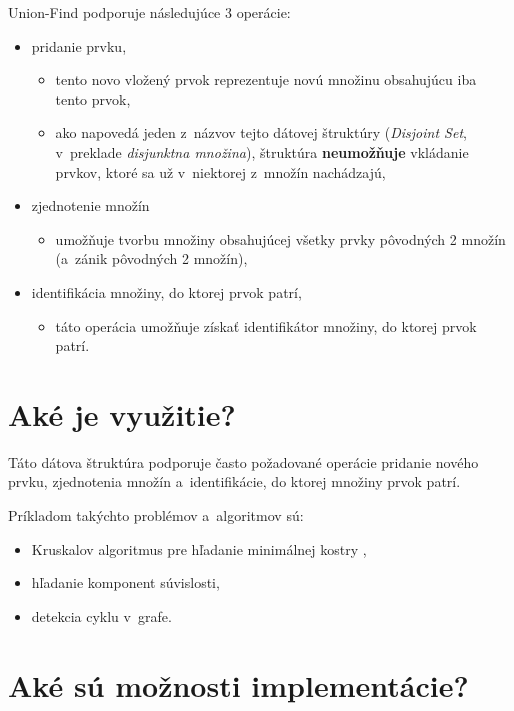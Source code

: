 Union-Find podporuje následujúce 3 operácie:

\newpage

\begin{itemize}
    \item pridanie prvku,
    \begin{itemize}
        \item tento novo vložený prvok reprezentuje novú množinu obsahujúcu iba tento prvok,
        \item ako napovedá jeden z~názvov tejto dátovej štruktúry (\emph{Disjoint Set}, v~preklade \emph{disjunktna množina}), štruktúra \textbf{neumožňuje} vkládanie prvkov, ktoré sa už v~niektorej z~množín nachádzajú,
    \end{itemize}
    \item zjednotenie množín
    \begin{itemize}
        \item umožňuje tvorbu množiny obsahujúcej všetky prvky pôvodných 2 množín (a~zánik pôvodných 2 množín),
    \end{itemize}
    \item identifikácia množiny, do ktorej prvok patrí,
    \begin{itemize}
        \item táto operácia umožňuje získať identifikátor množiny, do ktorej prvok patrí.
    \end{itemize}
\end{itemize}

\section{Aké je využitie?}

Táto dátova štruktúra podporuje často požadované operácie pridanie nového prvku, zjednotenia množín a~identifikácie, do ktorej množiny prvok patrí. 

Príkladom takýchto problémov a~algoritmov sú:
    
\begin{itemize}
    \item Kruskalov algoritmus pre hľadanie minimálnej kostry \cite{kruskal},
    \item hľadanie komponent súvislosti,
    \item detekcia cyklu v~grafe.
\end{itemize}

\section{Aké sú možnosti implementácie?}

